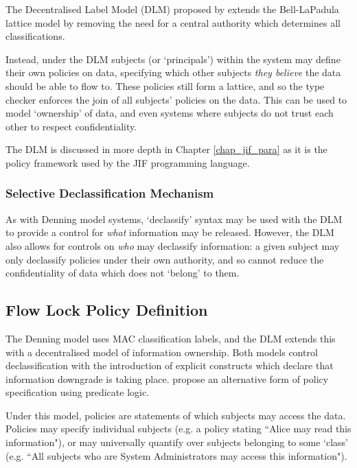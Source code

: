 The Decentralised Label Model (DLM) proposed by \citeauthor{myers1997if} \cite{myers1997if} extends the Bell-LaPadula lattice model by removing the need for a central authority which determines all classifications.

Instead, under the DLM subjects (or `principals') within the system may define their own policies on data, specifying which other subjects \textit{they believe} the data should be able to flow to. These policies still form a lattice, and so the type checker enforces the join of all subjects' policies on the data. This can be used to model `ownership' of data, and even systems where subjects do not trust each other to respect confidentiality.

The DLM is discussed in more depth in Chapter \ref{chap_jif_para} as it is the policy framework used by the JIF programming language.

\subsubsection{Selective Declassification Mechanism}

As with Denning model systems, `declassify' syntax may be used with the DLM to provide a control for \textit{what} information may be released. However, the DLM also allows for controls on \textit{who} may declassify information: a given subject may only declassify policies under their own authority, and so cannot reduce the confidentiality of data which does not `belong' to them.

\subsection{Flow Lock Policy Definition}

The Denning model uses MAC classification labels, and the DLM extends this with a decentralised model of information ownership. Both models control declassification with the introduction of explicit constructs which declare that information downgrade is taking place. \citeauthor{broberg2006flow} \cite{broberg2006flow} propose an alternative form of policy specification using predicate logic.

Under this model, policies are statements of which subjects may access the data. Policies may specify individual subjects (e.g. a policy stating ``Alice may read this information"), or may universally quantify over subjects belonging to some `class' (e.g. ``All subjects who are System Administrators may access this information").

